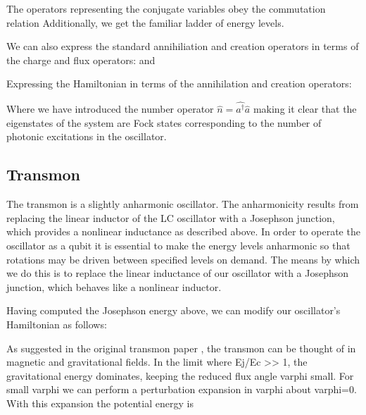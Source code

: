 The operators representing the conjugate variables obey the commutation relation
Additionally, we get the familiar ladder of energy levels.

We can also express the standard annihiliation and creation operators in terms of the charge and flux operators:
and

Expressing the Hamiltonian in terms of the annihilation and creation operators:

Where we have introduced the number operator $\hat{n} = \hat{a^\dagger} \hat{a}$ making it clear that the eigenstates of the system are Fock states corresponding to the number
of photonic excitations in the oscillator.

\subsection{Transmon}
The transmon is a slightly anharmonic oscillator.
The anharmonicity results from replacing the linear inductor of the LC oscillator with a Josephson junction, which provides a nonlinear inductance as described above.
In order to operate the oscillator as a qubit it is essential to make the energy levels anharmonic so that rotations may be driven between specified levels on demand.
The means by which we do this is to replace the linear inductance of our oscillator with a Josephson junction, which behaves like a nonlinear inductor.

Having computed the Josephson energy above, we can modify our oscillator's Hamiltonian as follows:

As suggested in the original transmon paper , the transmon can be thought of in magnetic and gravitational fields.
In the limit where Ej/Ec >> 1, the gravitational energy dominates, keeping the reduced flux angle varphi small.
For small varphi we can perform a perturbation expansion in varphi about varphi=0.
With this expansion the potential energy is

